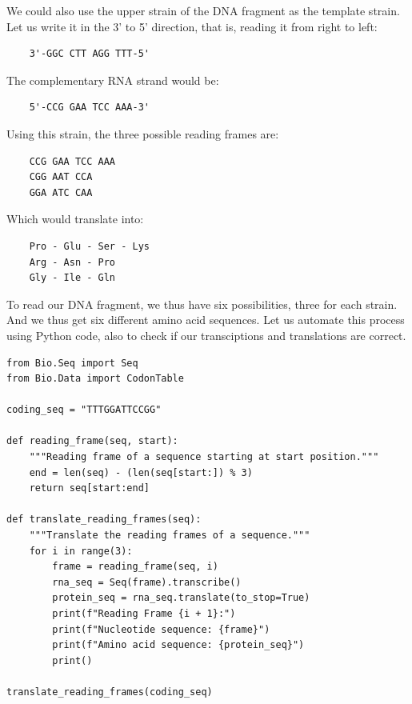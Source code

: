 We could also use the upper strain of the DNA fragment as the template strain. Let us write it in the 3' to 5' direction, that is, reading it from right to left:

\begin{verbatim}
    3'-GGC CTT AGG TTT-5'
\end{verbatim}

The complementary RNA strand would be:
\begin{verbatim}
    5'-CCG GAA TCC AAA-3'
\end{verbatim}

Using this strain, the three possible reading frames are:

\begin{verbatim}
    CCG GAA TCC AAA
    CGG AAT CCA
    GGA ATC CAA
\end{verbatim}

Which would translate into:

\begin{verbatim}
    Pro - Glu - Ser - Lys
    Arg - Asn - Pro
    Gly - Ile - Gln
\end{verbatim}

To read our DNA fragment,
we thus have six possibilities, three for each strain. And we thus get six different amino acid sequences. Let us automate this process using Python code, also to check if our transciptions and translations are correct.

\vspace*{3mm}
\begin{lstlisting}
from Bio.Seq import Seq
from Bio.Data import CodonTable

coding_seq = "TTTGGATTCCGG"

def reading_frame(seq, start):
    """Reading frame of a sequence starting at start position."""
    end = len(seq) - (len(seq[start:]) % 3)
    return seq[start:end]

def translate_reading_frames(seq):
    """Translate the reading frames of a sequence."""
    for i in range(3):
        frame = reading_frame(seq, i)
        rna_seq = Seq(frame).transcribe()
        protein_seq = rna_seq.translate(to_stop=True)
        print(f"Reading Frame {i + 1}:")
        print(f"Nucleotide sequence: {frame}")
        print(f"Amino acid sequence: {protein_seq}")
        print()

translate_reading_frames(coding_seq)
\end{lstlisting}

